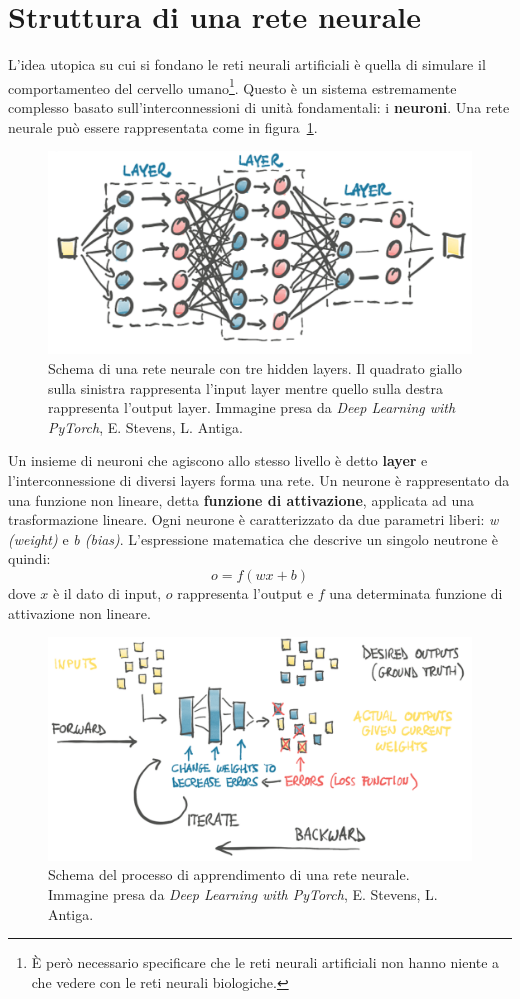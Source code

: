 \documentclass[12pt,a4paper,final]{book}
\begin{document}
\section{Struttura di una rete neurale}
L'idea utopica su cui si fondano le reti neurali artificiali è quella di simulare il comportamenteo del cervello umano\footnote{\`E però necessario specificare che le reti neurali artificiali non hanno niente a che vedere con le reti neurali biologiche.}. Questo è un sistema estremamente complesso basato sull'interconnessioni di unità fondamentali: i \textbf{neuroni}.
Una rete neurale può essere rappresentata come in figura~\ref{schema_rete}.
\begin{figure}[!ht]
	\centering
	\includegraphics[width=0.6\linewidth]{../figures/schema_rete.png}
	\caption{Schema di una rete neurale con tre hidden layers. Il quadrato giallo sulla sinistra rappresenta l'input layer mentre quello sulla destra rappresenta l'output layer. Immagine presa da \textit{Deep Learning with PyTorch}, E. Stevens, L. Antiga\cite{stevens}.}
	\label{schema_rete}
\end{figure}
Un insieme di neuroni che agiscono allo stesso livello è detto \textbf{layer} e l'interconnessione di diversi layers forma una rete.
Un neurone è rappresentato da una funzione non lineare, detta \textbf{funzione di attivazione}, applicata ad una trasformazione lineare. Ogni neurone è caratterizzato da due parametri liberi: \textit{w (weight)} e \textit{b (bias)}. L'espressione matematica che descrive un singolo neutrone è quindi:
\[o=f(wx+b)\]
 dove $x$ è il dato di input, $o$ rappresenta l'output e $f$ una determinata funzione di attivazione non lineare.

\begin{figure}[!ht]
	\centering
	\includegraphics[width=0.7\linewidth]{../figures/learning_process.png}
	\caption{Schema del processo di apprendimento di una rete neurale. Immagine presa da \textit{Deep Learning with PyTorch}, E. Stevens, L. Antiga\cite{stevens}.}
	\label{apprendimento}
\end{figure}
\end{document}
